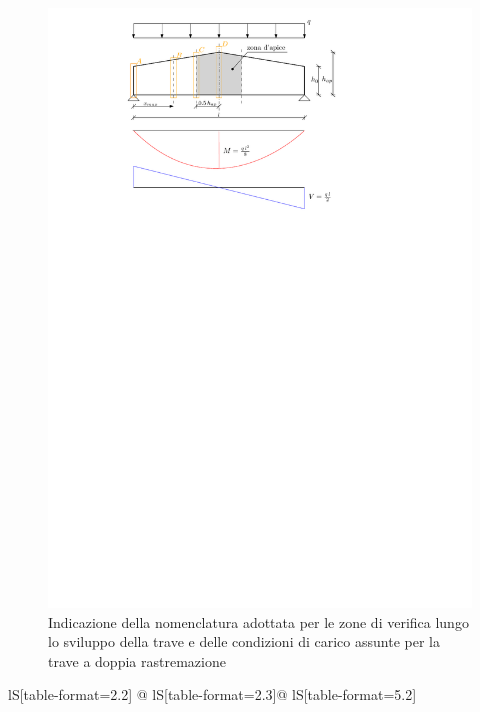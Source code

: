 \begin{pysub}[TraveDoppiaRastremazione]
\begin{figure}[H]
    \centering
    \includegraphics[]{IMG/TraveDoppiaRastremazione.pdf}
    \caption{Indicazione della nomenclatura adottata per le zone di verifica lungo lo sviluppo della trave e delle condizioni di carico assunte per la trave a doppia rastremazione}
    \label{fig:TraveDoppiaRastremazione}
\end{figure}
\begin{table}[H]
    \centering
    \caption{Valori di progetto per la verifica della trave a doppia rastremazione}
    \begin{tabular}{lS[table-format=2.2] @{\hspace{2cm}} lS[table-format=2.3]@{\hspace{2cm}} lS[table-format=5.2]}
        \toprule
		\\

\end{tabular}
\end{table}
\end{pysub}

